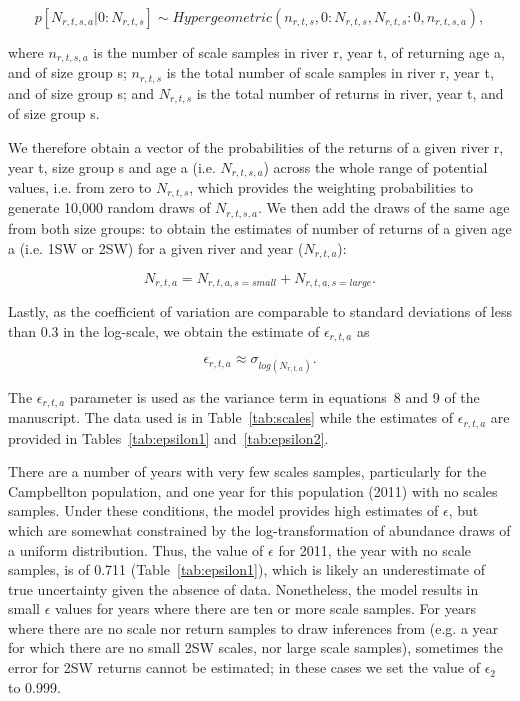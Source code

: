 \documentclass[12pt]{article}
\begin{document}
\begin{equation}
p[N_{r,t,s,a}|0:N_{r,t,s}] \sim Hypergeometric(n_{r,t,s}, 0:N_{r,t,s}, N_{r,t,s}:0, n_{r,t,s,a}),
\end{equation}

where $n_{r,t,s,a}$ is the number of scale samples in river r, year t, of returning age a, and of size group s;
$n_{r,t,s}$ is the total number of scale samples in river r, year t, and of size group s; and
$N_{r,t,s}$ is the total number of returns in river, year t, and of size group s.

We therefore obtain a vector of the probabilities of the returns of a given river r, year t, size group s and age a (i.e. $N_{r,t,s,a}$)
across the whole range of potential values, i.e. from zero to $N_{r,t,s}$, which provides the weighting probabilities to generate 10,000 random draws of $N_{r,t,s,a}$. 
We then add the draws of the same age from both size groups:
to obtain the estimates of number of returns of a given age a (i.e. 1SW or 2SW) for a given river and year ($N_{r,t,a}$):

\begin{equation}
N_{r,t,a} = N_{r,t,a,s=small}+ N_{r,t,a,s=large}.
\end{equation}

Lastly, as the coefficient of variation are comparable to standard deviations of less than 0.3 in the log-scale, we obtain
the estimate of $\epsilon_{r,t,a}$ as 

\begin{equation}
\epsilon_{r,t,a} \approx \sigma_{log(N_{r,t,a})}.
\end{equation}

The $\epsilon_{r,t,a}$ parameter is used as the variance term in equations~8 and 9 of the manuscript.
The data used is in Table~\ref{tab:scales} while the estimates of $\epsilon_{r,t,a}$ are provided in Tables~\ref{tab:epsilon1} and~\ref{tab:epsilon2}.

There are a number of years with very few scales samples, particularly for the
Campbellton population, and one year for this population (2011) with no scales
samples. Under these conditions, the model provides high estimates of
$\epsilon$, but which are somewhat constrained by the log-transformation of
abundance draws of a uniform distribution. Thus, the value of $\epsilon$ for
2011, the year with no scale samples, is of 0.711 (Table~\ref{tab:epsilon1}),
which is likely an underestimate of true uncertainty given the absence of
data. Nonetheless, the model results in small $\epsilon$ values for years
where there are ten or more scale samples. 
For years where there are no scale nor return samples to draw inferences from (e.g. a year for which there are no small 2SW scales, nor large scale samples),
sometimes the error for 2SW returns cannot be estimated; in these cases we set the value of $\epsilon_{2}$ to 0.999.
\end{document}
